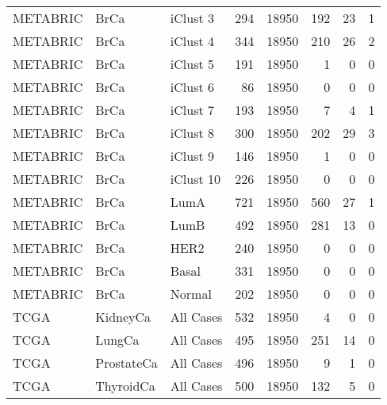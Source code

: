 \documentclass[]{article}
\begin{document}
\begin{table}[H]
{\begin{tabular}{lllrrrrr}
METABRIC & BrCa & iClust 3 & 294 & 18950 & 192 & 23 & 1\\
METABRIC & BrCa & iClust 4 & 344 & 18950 & 210 & 26 & 2\\
METABRIC & BrCa & iClust 5 & 191 & 18950 & 1 & 0 & 0\\
\addlinespace
METABRIC & BrCa & iClust 6 & 86 & 18950 & 0 & 0 & 0\\
METABRIC & BrCa & iClust 7 & 193 & 18950 & 7 & 4 & 1\\
METABRIC & BrCa & iClust 8 & 300 & 18950 & 202 & 29 & 3\\
METABRIC & BrCa & iClust 9 & 146 & 18950 & 1 & 0 & 0\\
METABRIC & BrCa & iClust 10 & 226 & 18950 & 0 & 0 & 0\\
\addlinespace
METABRIC & BrCa & LumA & 721 & 18950 & 560 & 27 & 1\\
METABRIC & BrCa & LumB & 492 & 18950 & 281 & 13 & 0\\
METABRIC & BrCa & HER2 & 240 & 18950 & 0 & 0 & 0\\
METABRIC & BrCa & Basal & 331 & 18950 & 0 & 0 & 0\\
METABRIC & BrCa & Normal & 202 & 18950 & 0 & 0 & 0\\
\addlinespace
TCGA & KidneyCa & All Cases & 532 & 18950 & 4 & 0 & 0\\
TCGA & LungCa & All Cases & 495 & 18950 & 251 & 14 & 0\\
TCGA & ProstateCa & All Cases & 496 & 18950 & 9 & 1 & 0\\
TCGA & ThyroidCa & All Cases & 500 & 18950 & 132 & 5 & 0\\
\bottomrule
\end{tabular}}
\end{table}
\end{document}

